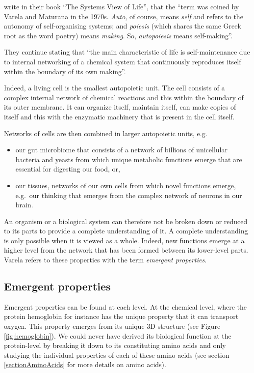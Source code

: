 \documentclass[
  11pt,
]{book}
\providecommand{\tightlist}{%
  \setlength{\itemsep}{0pt}\setlength{\parskip}{0pt}}
\begin{document}
\citet{capraLuisi2014} write in their book ``The Systems View of Life'', that the ``term was coined by Varela and Maturana in the 1970s. \emph{Auto}, of course, means \emph{self} and refers to the autonomy of self-organising systems; and \emph{poiesis} (which shares the same Greek root as the word poetry) means \emph{making}. So, \emph{autopoiesis} means self-making''.

They continue stating that ``the main characteristic of life is self-maintenance due to internal networking of a chemical system that continuously reproduces itself within the boundary of its own making''.

Indeed, a living cell is the smallest autopoietic unit.
The cell consists of a complex internal network of chemical reactions and this within the boundary of its outer membrane.
It can organize itself, maintain itself, can make copies of itself and this with the enzymatic machinery that is present in the cell itself.

Networks of cells are then combined in larger autopoietic units, e.g.~

\begin{itemize}
\tightlist
\item
  our gut microbiome that consists of a network of billions of unicellular bacteria and yeasts from which unique metabolic functions emerge that are essential for digesting our food, or,
\item
  our tissues, networks of our own cells from which novel functions emerge, e.g.~our thinking that emerges from the complex network of neurons in our brain.
\end{itemize}

An organism or a biological system can therefore not be broken down or reduced to its parts to provide a complete understanding of it. A complete understanding is only possible when it is viewed as a whole.
Indeed, new functions emerge at a higher level from the network that has been formed between its lower-level parts. Varela refers to these properties with the term \emph{emergent properties}.

\hypertarget{emergent-properties}{%
\subsection{Emergent properties}\label{emergent-properties}}

Emergent properties can be found at each level. At the chemical level, where the protein hemoglobin for instance has the unique property that it can transport oxygen. This property emerges from its unique 3D structure (see Figure \ref{fig:hemoglobin}). We could never have derived its biological function at the protein-level by breaking it down to its constituting amino acids and only studying the individual properties of each of these amino acids (see section \ref{sectionAminoAcids} for more details on amino acids).
\end{document}
